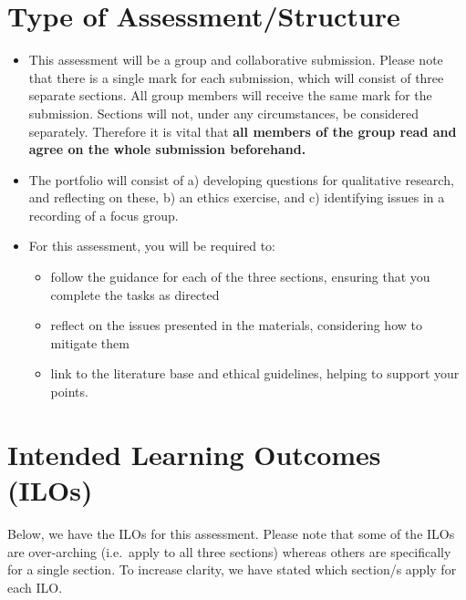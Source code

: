 \documentclass[
  english,
  letterpaper,
  DIV=11,
  numbers=noendperiod]{scrreprt}
\providecommand{\tightlist}{%
  \setlength{\itemsep}{0pt}\setlength{\parskip}{0pt}}
\begin{document}
\section{Type of
Assessment/Structure}\label{type-of-assessmentstructure-2}

\begin{itemize}
\item
  This assessment will be a group and collaborative submission. Please
  note that there is a single mark for each submission, which will
  consist of three separate sections. All group members will receive the
  same mark for the submission. Sections will not, under any
  circumstances, be considered separately. Therefore it is vital that
  \textbf{all members of the group read and agree on the whole
  submission beforehand.}
\item
  The portfolio will consist of a) developing questions for qualitative
  research, and reflecting on these, b) an ethics exercise, and c)
  identifying issues in a recording of a focus group.
\item
  For this assessment, you will be required to:

  \begin{itemize}
  \tightlist
  \item
    follow the guidance for each of the three sections, ensuring that
    you complete the tasks as directed
  \item
    reflect on the issues presented in the materials, considering how to
    mitigate them
  \item
    link to the literature base and ethical guidelines, helping to
    support your points.
  \end{itemize}
\end{itemize}

\section{Intended Learning Outcomes (ILOs)}\label{portfolio_ILOs}

Below, we have the ILOs for this assessment. Please note that some of
the ILOs are over-arching (i.e.~apply to all three sections) whereas
others are specifically for a single section. To increase clarity, we
have stated which section/s apply for each ILO.
\end{document}
